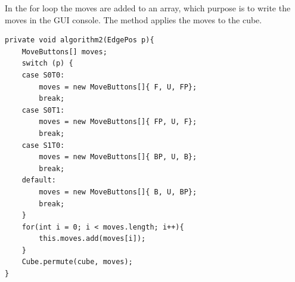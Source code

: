 In the for loop the moves are added to an array, which purpose is to write the moves in the GUI console. 
The  method applies the moves to the cube.

\begin{lstlisting}[style=sourceCode, caption=\myCaption{This is algorithm2, which will move an edge piece from the middle layer to the top layer without ruining any edge pieces which are correctly positioned in the cross.}, label=src:middleMove, float=htb]
private void algorithm2(EdgePos p){
	MoveButtons[] moves;
	switch (p) {
	case S0T0:
		moves = new MoveButtons[]{ F, U, FP};
		break;
	case S0T1:
		moves = new MoveButtons[]{ FP, U, F};
		break;
	case S1T0:
		moves = new MoveButtons[]{ BP, U, B};
		break;
	default:
		moves = new MoveButtons[]{ B, U, BP};
		break;
	}
	for(int i = 0; i < moves.length; i++){
		this.moves.add(moves[i]);
	}
	Cube.permute(cube, moves);
}
\end{lstlisting}

